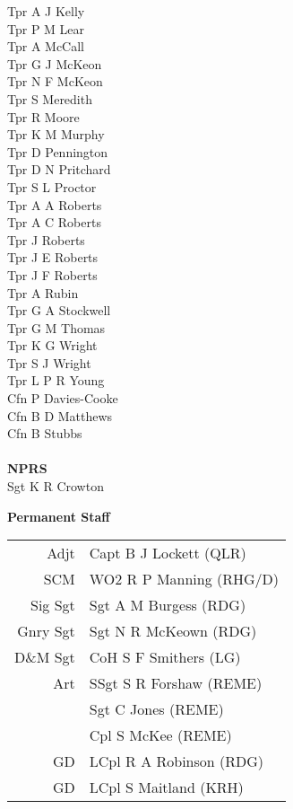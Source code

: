 \begin{multicols}{3}
  Tpr A J Kelly \\
  Tpr P M Lear \\
  Tpr A McCall \\
  Tpr G J McKeon \\
  Tpr N F McKeon \\
  Tpr S Meredith \\
  Tpr R Moore \\
  Tpr K M Murphy \\
  Tpr D Pennington \\
  Tpr D N Pritchard \\
  Tpr S L Proctor \\
  Tpr A A Roberts \\
  Tpr A C Roberts \\
  Tpr J Roberts \\
  Tpr J E Roberts \\
  Tpr J F Roberts \\
  Tpr A Rubin \\
  Tpr G A Stockwell \\
  Tpr G M Thomas \\
  Tpr K G Wright \\
  Tpr S J Wright \\
  Tpr L P R Young \\
  Cfn P Davies-Cooke \\
  Cfn B D Matthews \\
  Cfn B Stubbs \\
  \\
  \textbf{NPRS} \\
  Sgt K R Crowton \\
\end{multicols}

\vspace*{10mm}

\begin{center}
  \Large
  \textbf{Permanent Staff}
\end{center}

\begin{center}
  \begin{tabular}{rl}
    Adjt & Capt B J Lockett (QLR) \\
    SCM & WO2 R P Manning (RHG/D) \\
    Sig Sgt & Sgt A M Burgess (RDG) \\
    Gnry Sgt & Sgt N R McKeown (RDG) \\
    D\&M Sgt & CoH S F Smithers (LG) \\
    Art & SSgt S R Forshaw (REME) \\
    & Sgt C Jones (REME) \\
    & Cpl S McKee (REME) \\
    GD & LCpl R A Robinson (RDG) \\
    GD & LCpl S Maitland (KRH) \\
  \end{tabular}
\end{center}

